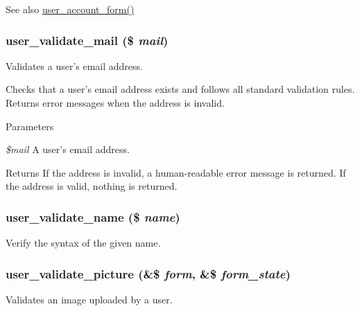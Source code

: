 \begin{DoxySeeAlso}{See also}
\hyperlink{user_8module_ab51965add9fd8ee2915e65d39213d05c}{user\_\-account\_\-form()} 
\end{DoxySeeAlso}
\hypertarget{user_8module_abe55c980b2faeab65d0a9942f99916dd}{
\subsubsection[{user\_\-validate\_\-mail}]{\setlength{\rightskip}{0pt plus 5cm}user\_\-validate\_\-mail (\$ {\em mail})}}
\label{user_8module_abe55c980b2faeab65d0a9942f99916dd}
Validates a user's email address.

Checks that a user's email address exists and follows all standard validation rules. Returns error messages when the address is invalid.


\begin{DoxyParams}{Parameters}
\item[{\em \$mail}]A user's email address.\end{DoxyParams}
\begin{DoxyReturn}{Returns}
If the address is invalid, a human-\/readable error message is returned. If the address is valid, nothing is returned. 
\end{DoxyReturn}
\hypertarget{user_8module_ad0830924747ece1dd3f35b0d0f4dd0f9}{
\subsubsection[{user\_\-validate\_\-name}]{\setlength{\rightskip}{0pt plus 5cm}user\_\-validate\_\-name (\$ {\em name})}}
\label{user_8module_ad0830924747ece1dd3f35b0d0f4dd0f9}
Verify the syntax of the given name. \hypertarget{user_8module_aa8b7bc791c72d8484dd8462440d41b3a}{
\subsubsection[{user\_\-validate\_\-picture}]{\setlength{\rightskip}{0pt plus 5cm}user\_\-validate\_\-picture (\&\$ {\em form}, \/  \&\$ {\em form\_\-state})}}
\label{user_8module_aa8b7bc791c72d8484dd8462440d41b3a}
Validates an image uploaded by a user.

